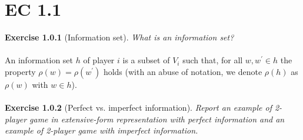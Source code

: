 \section{EC 1.1}

\textbf{Exercise 1.0.1} (Information set). \textit{What is an information set?}\\\\
An information set $h$ of player $i$ is a subset of $ V_{i} $ such that, for all $w, w^{\prime} \in h$ the property $ \rho(w) = \rho(w^{\prime}) $ holds (with an abuse of notation, we denote $ \rho(h)$ as $\rho(w) $ with $w \in h $).\\\\
\textbf{Exercise 1.0.2} (Perfect vs. imperfect information). \textit{Report an example of 2-player game in extensive-form
representation with perfect information and an example of 2-player game with imperfect information.}
